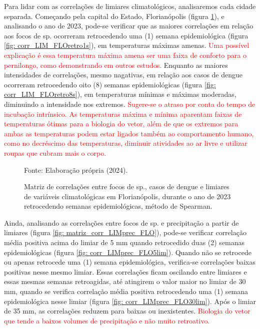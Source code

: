 \documentclass[
	12pt,				%
	openright,			%
	oneside,			%
	a4paper,			%
	english,			%
	french,				%
	spanish,			%
	brazil				%
	dvipsnames, table]{abntex2}
\begin{document}
\indent Para lidar com as correlações de limiares climatológicos, analisaremos cada cidade separada. Começando pela capital do Estado, Florianópolis (figura \ref{fig: matriz_corr_LIM_FLOretro}), e analisando o ano de 2023, pode-se verificar que as maiores correlações em relação aos focos de  sp. ocorreram retrocedendo uma (1) semana epidemiológica (figura \ref{fig: corr_LIM_FLOretro1s}), em temperaturas máximas amenas. \textcolor{red}{Uma possível explicação é essa temperatura máxima amena ser uma faixa de conforto para o pernilongo, como demonstrando em outros estudos.} Enquanto as maiores intensidades de correlações, mesmo nagativas, em relação aos casos de dengue ocorreram retrocedendo oito (8) semanas epidemiológicas (figura \ref{fig: corr_LIM_FLOretro8s}), em temperaturas mínimas e máximas moderadas, diminuindo a intensidade nos extremos. \textcolor{red}{Sugere-se o atraso por conta do tempo de incubação intrínsico. As temperaturas máxima e mínima aparentam faixas de temperaturas ótimas para a biologia do vetor, além de que os extremos para ambas as temperaturas podem estar ligados também ao comportamento humano, como no decréscimo das temperaturas, diminuir atividades ao ar livre e utilizar roupas que cubram mais o corpo.}

\begin{figure}[htbp]
    \begin{center}
    \caption{Matriz de correlações entre focos de  sp., casos de dengue e limiares de variáveis climatológicas em Florianópolis, durante o ano de 2023 retrocedendo semanas epidemiológicas, método de Spearman.}
    \label{fig: matriz_corr_LIM_FLOretro}
        \hfill
    \end{center}
    \small{Fonte: Elaboração própria (2024).}
\end{figure}

Ainda, analisando as correlações entre focos de  sp. e precipitação a partir de limiares (figura \ref{fig: matriz_corr_LIMprec_FLO}), pode-se verificar correlação média positiva acima do limiar de 5 mm quando retrocedido duas (2) semanas epidemiológicas (figura \ref{fig: corr_LIMprec_FLO5lim}). Quando não se retrocede ou apenas retrocede uma (1) semana epidemiológica, verifica-se correlações baixas positivas nesse mesmo limiar. Essas correlações ficam oscilando entre limiares e essas mesmas semanas retroagidas, até atingirem o valor maior no limiar de 30 mm, quando se verifica correlação média positiva retrocedendo uma (1) semana epidemiológica nesse limiar (figura \ref{fig: corr_LIMprec_FLO30lim}). Após o limiar de 35 mm, as correlações reduzem para baixas ou inexistentes. \textcolor{red}{Biologia do vetor que tende a baixos volumes de precipitação e não muito retroativo.}
\end{document}
